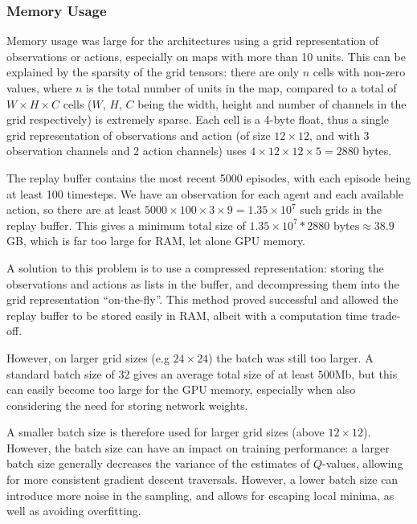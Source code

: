 \subsubsection{Memory Usage}

Memory usage was large for the architectures using a grid representation of observations or actions, especially on maps with more than 10 units. This can be explained by the sparsity of the grid tensors: there are only $n$ cells with non-zero values, where $n$ is the total number of units in the map, compared to a total of $W \times H \times C$ cells ($W$, $H$, $C$ being the width, height and number of channels in the grid respectively) is extremely sparse. Each cell is a 4-byte float, thus a single grid representation of observations and action (of size $12 \times 12$, and with 3 observation channels and 2 action channels) uses $4 \times 12 \times 12 \times 5 = 2880$ bytes. 

The replay buffer contains the most recent 5000 episodes, with each episode being at least 100 timesteps. We have an observation for each agent and each available action, so there are at least $5000 \times 100 \times 3 \times 9 = 1.35 \times 10^7$ such grids in the replay buffer. This gives a minimum total size of $1.35 \times 10^7 * 2880 \text{ bytes} \approx 38.9$GB, which is far too large for RAM, let alone GPU memory.


A solution to this problem is to use a compressed representation: storing the observations and actions as lists in the buffer, and decompressing them into the grid representation ``on-the-fly''. This method proved successful and allowed the replay buffer to be stored easily in RAM, albeit with a computation time trade-off.

However, on larger grid sizes (e.g $24\times24$) the batch was still too larger. A standard batch size of 32 \cite{smac} gives an average total size of at least $500$Mb, but this can easily become too large for the GPU memory, especially when also considering the need for storing network weights. 

A smaller batch size is therefore used for larger grid sizes (above $12 \times 12$). However, the batch size can have an impact on training performance: a larger batch size generally decreases the variance of the estimates of $Q$-values, allowing for more consistent gradient descent traversals. However, a lower batch size can introduce more noise in the sampling, and allows for escaping local minima, as well as avoiding overfitting.

